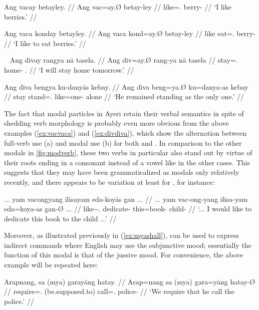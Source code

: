 \pex\label{ex:vacvaca}
\a\label{ex:vacfull}\begingl
	\gla Ang vacay betayley. //
	\glb Ang vac=ay.Ø betay-ley //
	\glc \AgtT{} like=\Fsg{}.\Top{} berry-\PargI{} //
	\glft `I like berries.' //
\endgl

\a\label{ex:vacamod}\begingl
	\gla Ang vaca konday betayley. //
	\glb Ang vaca kond=ay.Ø betay-ley //
	\glc \AgtT{} like eat=\Fsg{}.\Top{} berry-\PargI{} //
	\glft `I like to eat berries.' //
\endgl
\xe

\pex~\label{ex:divdiva}
\a\label{ex:divfull}\begingl
	\gla Ang divay rangya nā tasela. //
	\glb Ang div=ay.Ø rang-ya nā tasela //
	\glc \AgtT{} stay=\Fsg{}.\Top{} home-\Loc{} \Fsg{}.\Gen{} //
	\glft `I will stay home tomorrow.' //
\endgl

\a\label{ex:divamod}\begingl
	\gla Ang diva bengya ku-danyās kebay. //
	\glb Ang diva beng=ya.Ø ku=danya-as kebay //
	\glc \AgtT{} stay stand=\TsgM{}.\Top{} like=one-\Parg{} alone //
	\glft `He remained standing as the only one.' //
\endgl
\xe

The fact that modal particles in Ayeri retain their verbal semantics in spite 
of shedding verb morphology is probably even more obvious from the above 
examples (\ref{ex:vacvaca}) and (\ref{ex:divdiva}), which show the alternation 
between full-verb use (a) and modal use (b) for both  and 
. In comparison to the other modals in 
\autoref{fig:modverb}, these two verbs in particular also stand out by virtue 
of their roots ending in a consonant instead of a vowel like in the other 
cases. This suggests that they may have been grammaticalized as modals 
only relatively recently, and there appears to be variation at least for 
, for instance:

\ex\begingl
	\gla ... yam vacongyang ilisayam eda-koyās gan ... //
	\glb ... yam vac-ong-yang ilisa-yam eda=koya-as gan-Ø ... //
	\glc {} \DatT{} like-\Irr{}-\Fsg{}.\Aarg{} dedicate-\Ptcp{} 		
		this=book-\Parg{} child-\Top{} {} //
	\glft `... I would like to dedicate this book to the child ...' 
		 //
\endgl\xe

Moreover, as illustrated previously in (\ref{ex:myashall}),  can be used to express indirect commands where English may 
use the subjunctive mood; essentially the function of this modal is that of 
the jussive mood. For convenience, the above example will be repeated here:

\ex\begingl
	\gla Arapnang, sa {\normalfont (}mya{\normalfont )} garayāng hatay. //
	\glb Arap=nang sa (mya) gara=yāng hatay-Ø //
	\glc require=\Fpl{}.\Aarg{} \PatT{} (be.supposed.to) 
		call=\TsgM{}.\Aarg{} police-\Top{} //
	\glft `We require that he call the police.' //
\endgl\xe

